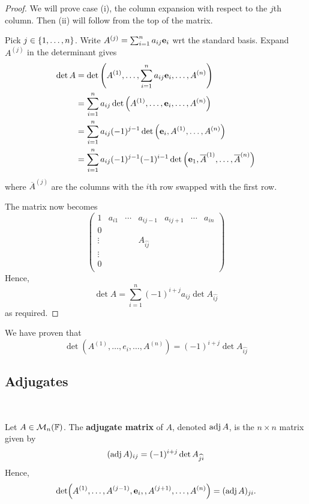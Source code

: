 \documentclass[a4paper,11pt]{article}
\begin{document}
\begin{proof}
	We will prove case (i), the column expansion with respect to the $ j $th column.
	Then (ii) will follow from the top of the matrix.

	Pick $ j \in \qty{1, \dots, n} $.
	Write $ A^{(j)} = \sum_{i=1}^n a_{ij} {\bf e}_i $ wrt the standard basis. Expand $A^{(j)}$ in the determinant gives
	\begin{align*}
		\det A & = \det\qty(A^{(1)}, \dots, \sum_{i=1}^n a_{ij} {\bf e}_i, \dots, A^{(n)})                                    \\
		       & = \sum_{i=1}^n a_{ij} \det\qty(A^{(1)}, \dots, {\bf e}_i, \dots, A^{(n)})                                    \\
		       & = \sum_{i=1}^n a_{ij} (-1)^{j-1} \det\qty({\bf e}_i, A^{(1)}, \dots, A^{(n)})                                \\
		       & = \sum_{i=1}^n a_{ij} (-1)^{j-1} (-1)^{i-1} \det\qty({\bf e}_1, \overline A^{(1)}, \dots, \overline A^{(n)})
	\end{align*}
	where $ \overline{A}^{(j)} $ are the columns with the $i$th row swapped with the first row. 

	The matrix now becomes 
	\[
		\begin{pmatrix}
			1 & a_{i 1} & \cdots & a_{i j-1} &  a_{i j+1} & \cdots & a_{i n} \\
			0 &  &  &  &  &  &  \\
			\vdots &  &  & A_{\widehat{ij}} &  &  & \\
			\vdots &  &  &  &  &  & \\
			0 &  &  &  &  &  & \\
		\end{pmatrix}
	\]
	Hence,
	\[
		\det A = \sum_{i=1}^n (-1)^{i+j} a_{ij} \det A_{\widehat{ij}}
	\]
	as required.
\end{proof}
We have proven that
\[
	\det (A^{(1)}, \dots, e_i, \dots, A^{(n)}) = (-1)^{i+j} \det A_{\widehat{ij}}
\]

\subsection{Adjugates}\ \vspace{-1.5em}
\begin{definition}
	Let $ A \in {\mathcal{M}}_n({\mathbb{F}}) $.
	The \textbf{adjugate matrix} of $ A $, denoted $ \operatorname{adj} A $, is the $ n \times n $ matrix given by
	\[
		(\operatorname{adj} A)_{ij} = (-1)^{i+j} \det A_{\widehat{ji}}
	\]
	Hence,
	\[
		\det (A^{(1)}, \dots, A^{(j-1)}, {\bf e}_i, , A^{(j+1)},\dots, A^{(n)}) = (\operatorname{adj} A)_{ji}.
	\]
\end{definition}
\end{document}
